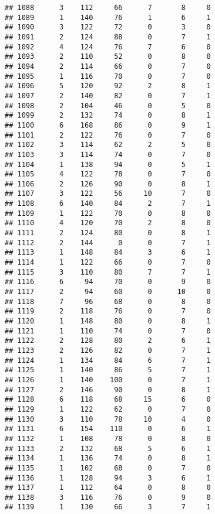 \documentclass[
]{article}
\begin{document}
\begin{verbatim}
## 1088      3    112     66      7       8     0
## 1089      1    140     76      1       6     1
## 1090      3    122     72      0       3     0
## 1091      2    124     88      0       7     1
## 1092      4    124     76      7       6     0
## 1093      2    110     52      0       8     0
## 1094      2    114     66      0       7     0
## 1095      1    116     70      0       7     0
## 1096      5    120     92      2       8     1
## 1097      2    140     82      0       7     1
## 1098      2    104     46      0       5     0
## 1099      2    132     74      0       8     1
## 1100      6    168     86      0       9     1
## 1101      2    122     76      0       7     0
## 1102      3    114     62      2       5     0
## 1103      3    114     74      0       7     0
## 1104      1    138     94      0       5     1
## 1105      4    122     78      0       7     0
## 1106      2    126     90      0       8     1
## 1107      3    122     56     10       7     0
## 1108      6    140     84      2       7     1
## 1109      1    122     70      0       8     0
## 1110      4    120     70      2       8     0
## 1111      2    124     80      0       8     1
## 1112      2    144      0      0       7     1
## 1113      1    148     84      3       6     1
## 1114      1    122     66      0       7     0
## 1115      3    110     80      7       7     1
## 1116      6     94     70      0       9     0
## 1117      2     94     60      0      10     0
## 1118      7     96     68      0       8     0
## 1119      2    118     76      0       7     0
## 1120      1    148     80      0       8     1
## 1121      1    110     74      0       7     0
## 1122      2    128     80      2       6     1
## 1123      2    126     82      0       7     1
## 1124      1    134     84      6       7     1
## 1125      1    140     86      5       7     1
## 1126      1    140    100      0       7     1
## 1127      2    146     90      0       8     1
## 1128      6    118     68     15       6     0
## 1129      1    122     62      0       7     0
## 1130      3    110     78     10       4     0
## 1131      6    154    110      0       6     1
## 1132      1    108     78      0       8     0
## 1133      2    132     68      5       6     1
## 1134      1    136     74      0       8     1
## 1135      1    102     68      0       7     0
## 1136      1    128     94      3       6     1
## 1137      1    112     64      0       8     0
## 1138      3    116     76      0       9     0
## 1139      1    130     66      3       7     1

\end{verbatim}
\end{document}
